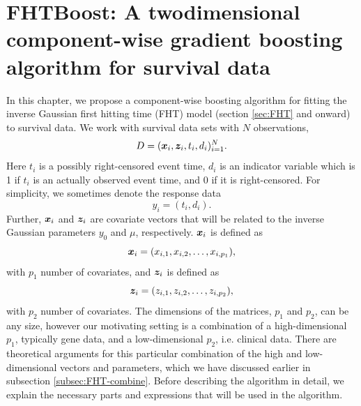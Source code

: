 \chapter{FHTBoost: A twodimensional component-wise gradient boosting algorithm for survival data}
\label{ch:FHTboost}
In this chapter, we propose a component-wise boosting algorithm for fitting the inverse Gaussian first hitting time (FHT) model (section \ref{sec:FHT} and onward) to survival data.
We work with survival data sets with $N$ observations,
\begin{equation}\label{eq:data-fhtboost}
    D=(\bm{x}_i,\bm{z}_i,t_i,d_i)_{i=1}^N.
\end{equation}
Here $t_i$ is a possibly right-censored event time, $d_i$ is an indicator variable which is 1 if $t_i$ is an actually observed event time, and 0 if it is right-censored.
For simplicity, we sometimes denote the response data
\begin{equation*}
    y_i=(t_i,d_i).
\end{equation*}
Further, $\bm{x}_i$ and $\bm{z}_i$ are covariate vectors that will be related to the inverse Gaussian parameters $y_0$ and $\mu$, respectively.
$\bm{x}_i$ is defined as
\begin{equation}
    \bm{x}_i=(x_{i,1},x_{i,2},\ldots,x_{i,p_1}),
\end{equation}
with $p_1$ number of covariates, and $\bm{z}_i$ is defined as
\begin{equation}
    \bm{z}_i=(z_{i,1},z_{i,2},\ldots,z_{i,p_2}),
\end{equation}
with $p_2$ number of covariates.
The dimensions of the matrices, $p_1$ and $p_2$, can be any size, however our motivating setting is a combination of a high-dimensional $p_1$, typically gene data, and a low-dimensional $p_2$, i.e. clinical data. 
There are theoretical arguments for this particular combination of the high and low-dimensional vectors and parameters, which we have discussed earlier in subsection \ref{subsec:FHT-combine}.
Before describing the algorithm in detail, we explain the necessary parts and expressions that will be used in the algorithm.

